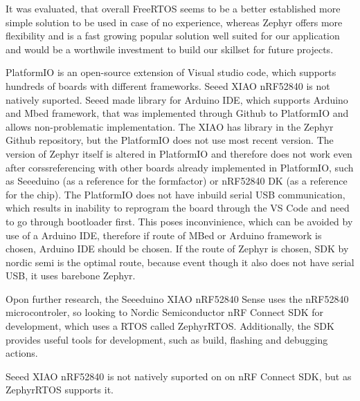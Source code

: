 It was evaluated, that overall FreeRTOS seems to be a better established more simple solution to be used in case of no experience, whereas Zephyr offers more flexibility and is a fast growing popular solution well suited for our application and would be a worthwile investment to build our skillset for future projects. \cite{Industry}

PlatformIO is an open-source extension of Visual studio code, which supports hundreds of boards with different frameworks. \cite{Platform} Seeed XIAO nRF52840 is not natively suported. Seeed made library for Arduino IDE, which supports Arduino and Mbed framework, that was implemented through Github to PlatformIO and allows non-problematic implementation.
The XIAO has library in the Zephyr Github repository, but the PlatformIO does not use most recent version. The version of Zephyr itself is altered in PlatformIO and therefore does not work even after corssreferencing with other boards already implemented in PlatformIO, such as Seeeduino (as a reference for the formfactor) or nRF52840 DK (as a reference for the chip).
The PlatformIO does not have inbuild serial USB communication, which results in inability to reprogram the board through the VS Code and need to go through bootloader first. This poses inconvinience, which can be avoided by use of a Arduino IDE, therefore if route of MBed or Arduino framework is chosen, Arduino IDE should be chosen. If the route of Zephyr is chosen, SDK by nordic semi is the optimal route, because event though it also does not have serial USB, it uses barebone Zephyr.

Opon further research, the Seeeduino XIAO nRF52840 Sense uses the nRF52840 microcontroler, so looking to Nordic Semiconductor nRF Connect SDK for development, which uses a RTOS called ZephyrRTOS.
Additionally, the SDK provides useful tools for development, such as build, flashing and debugging actions. \cite{nRF}


Seeed XIAO nRF52840 is not natively suported on on nRF Connect SDK, but as ZephyrRTOS supports it. \cite{docsZephyr}

